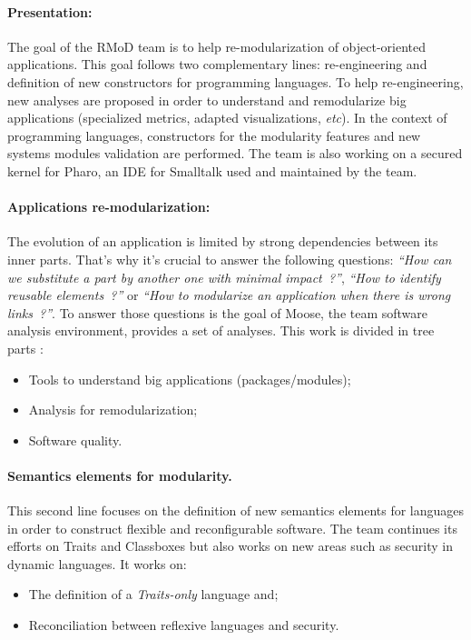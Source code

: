\paragraph{Presentation: } The goal of the RMoD team is to help re-modularization of object-oriented applications. This goal follows two complementary lines: re-engineering and definition of new constructors for programming languages. To help re-engineering, new analyses are proposed in order to understand and remodularize big applications (specialized metrics, adapted visualizations, \emph{etc}). In the context of programming languages, constructors for the modularity features and new systems modules validation are performed. The team is also working on a secured kernel for Pharo, an \gls{IDE} for Smalltalk used and maintained by the team.

\paragraph{Applications re-modularization: } The evolution of an application is limited by strong dependencies between its inner parts. That's why it's crucial to answer the following questions:
\emph{``How can we substitute a part by another one with minimal impact~?''}, \emph{``How to identify reusable elements~?''} or \emph{``How to modularize an application when there is wrong links~?''}. To answer those questions is the goal of Moose, the team software analysis environment, provides a set of analyses.
This work is divided in tree parts :
	\begin{itemize}
		\item Tools to understand big applications (packages/modules);
		\item Analysis for remodularization;
		\item Software quality.
	\end{itemize}
	
\paragraph{Semantics elements for modularity.} This second line focuses on the definition of new semantics elements for languages in order to construct flexible and reconfigurable software. The team continues its efforts on Traits and Classboxes but also works on new areas such as security in dynamic languages. It works on:
	\begin{itemize}
		\item The definition of a \emph{Traits-only} language and;
		\item Reconciliation between reflexive languages and security.
	\end{itemize}